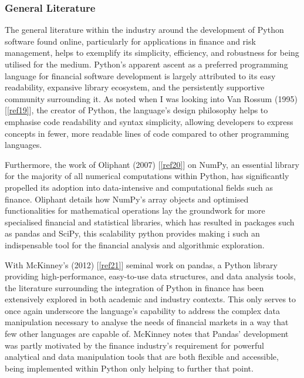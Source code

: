 \documentclass{article}
\begin{document}
\subsubsection{General Literature}

The general literature within the industry around the development of Python software found online, particularly for applications in finance and risk management, helps to exemplify its simplicity, efficiency, and robustness for being utilised for the medium. Python's apparent ascent as a preferred programming language for financial software development is largely attributed to its easy readability, expansive library ecosystem, and the persistently supportive community surrounding it. As noted when I was looking into Van Rossum (1995) [\ref{ref19}], the creator of Python, the language's design philosophy helps to emphasise code readability and syntax simplicity, allowing developers to express concepts in fewer, more readable lines of code compared to other programming languages.\\\vspace{0.3cm}

Furthermore, the work of Oliphant (2007) [\ref{ref20}] on NumPy, an essential library for the majority of all numerical computations within Python, has significantly propelled its adoption into data-intensive and computational fields such as finance. Oliphant details how NumPy's array objects and optimised functionalities for mathematical operations lay the groundwork for more specialised financial and statistical libraries, which has resulted in packages such as pandas and SciPy, this scalability python provides making i such an indispensable tool for the financial analysis and algorithmic exploration.\\\vspace{0.3cm}

With McKinney's (2012) [\ref{ref21}] seminal work on pandas, a Python library providing high-performance, easy-to-use data structures, and data analysis tools, the literature surrounding the integration of Python in finance has been extensively explored in both academic and industry contexts. This only serves to once again underscore the language's capability to address the complex data manipulation necessary to analyse the needs of financial markets in a way that few other languages are capable of. McKinney notes that Pandas' development was partly motivated by the finance industry's requirement for powerful analytical and data manipulation tools that are both flexible and accessible, being implemented within Python only helping to further that point.\\\vspace{0.3cm}
\end{document}

